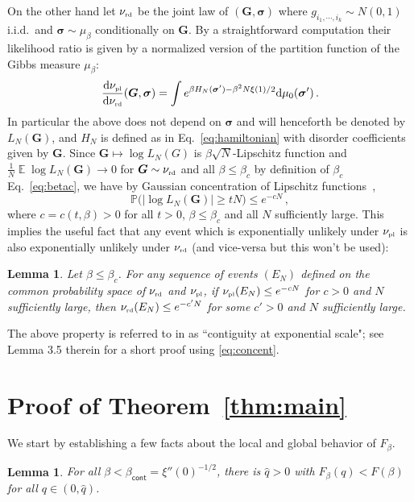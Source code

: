 \documentclass[11pt]{article}
\newtheorem{lemma}[theorem]{Lemma}
\theoremstyle{definition}
\numberwithin{equation}{section}
\newcommand{\<}{\langle}
\renewcommand{\>}{\rangle}
\def\bsigma{{\boldsymbol{\sigma}}}
\def\bbE{{\mathbb{E}}}
\def\pl{\mbox{\rm\tiny pl}}
\def\rd{\mbox{\rm\tiny rd}}
\def\de{{\rm d}}
\def\bG{{\boldsymbol G}}
\def\P{\mathbb{P}}
\DeclareMathOperator*{\E}{\bbE}
\def\cont{{\mathsf{cont}}}
\begin{document}
On the other hand let $\nu_{\rd}$ be the joint law of $(\bG,\bsigma)$ where $g_{i_1,\cdots,i_k} \sim N(0,1)$ i.i.d.\ and $\bsigma \sim \mu_{\beta}$ conditionally on $\bG$. By a straightforward computation their likelihood ratio is given by a normalized version of the partition function of the Gibbs measure $\mu_{\beta}$:
\begin{equation}\label{eq:lr} 
\frac{\de \nu_{\pl}}{\de \nu_{\rd}} (\bG,\bsigma) = \int e^{\beta H_N(\bsigma') - \beta^2 N \xi(1)/2} \de \mu_0(\bsigma')\,. 
\end{equation}%
In particular the above does not depend on $\bsigma$ and will henceforth be denoted by $L_N(\bG)$, and $H_N$ is defined as in Eq.~\eqref{eq:hamiltonian} with disorder coefficients given by $\bG$. 
Since $\bG \mapsto \log L_N(G)$ is $\beta \sqrt{N}$-Lipschitz function and $\frac{1}{N} \E\log L_N(\bG) \to 0$ for $\bG \sim \nu_{\rd}$ and all $\beta \le \beta_c$ by definition of $\beta_c$ Eq.~\eqref{eq:betac}, we have by Gaussian concentration of Lipschitz functions~\cite[Theorem 5.6]{boucheron2013concentration},
\begin{equation} \label{eq:concent}
\P\big( |\log L_N(\bG)| \ge t N\big) \le e^{-cN} \,,
\end{equation}
where $c = c(t,\beta)>0$ for all $t>0$, $\beta \le \beta_c$ and all $N$ sufficiently large. 
This implies the useful fact that any event which is exponentially unlikely under $\nu_{\pl}$ is also exponentially unlikely under $\nu_{\rd}$ (and vice-versa but this won't be used):
%
\begin{lemma} \label{lem:contig}
Let $\beta\le \beta_c$.     For any sequence of events $(E_N)$ defined on the common probability space of $\nu_{\rd}$ and $\nu_{\pl}$, if $\nu_{\pl}(E_N) \le e^{-cN}$ for $c>0$ and $N$ sufficiently large, then $\nu_{\rd}(E_N) \le e^{-c'N}$ for some $c'>0$ and $N$ sufficiently large.
\end{lemma}
%
The above property is referred to in \cite{alaoui2023shattering} as ``contiguity at exponential scale"; see Lemma 3.5 therein for a short proof using \eqref{eq:concent}.
%


\section{Proof of Theorem~\ref{thm:main}}
\label{sec:proofmain}
 We start by establishing a few facts about the local and global behavior of $F_{\beta}$. 
%
\begin{lemma}
\label{lem:FPbound}
For all $\beta < \beta_{\cont} = \xi''(0)^{-1/2}$, there is $\hat{q}>0$ with $F_{\beta}(q) < F(\beta)$ for all $q \in (0,\hat{q})$.
\end{lemma} 
\end{document}
